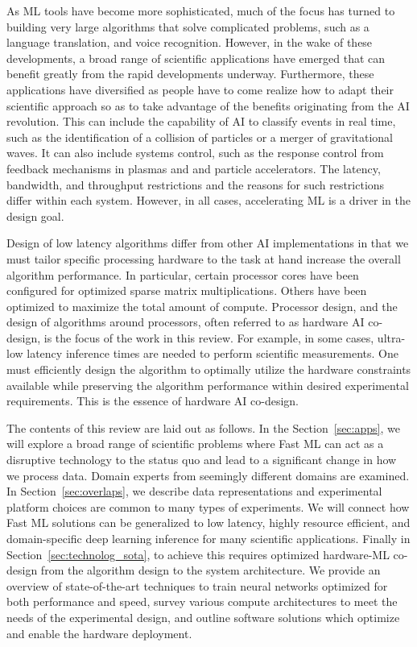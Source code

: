 As ML tools have become more sophisticated, much of the focus has turned to building very large  algorithms that solve complicated problems, such as a language translation, and voice recognition. 
However, in the wake of these developments, a broad range of scientific applications have emerged that can benefit  greatly from the rapid developments underway. 
Furthermore, these applications have diversified as people have to come realize how to adapt their scientific approach so as to take advantage of the benefits originating from the AI revolution. 
This can include the capability of AI to classify events in real time, such as the identification of a collision of particles or a merger of gravitational waves. 
It can also include systems control, such as the response control from feedback mechanisms in plasmas and and particle accelerators. 
The latency, bandwidth, and throughput restrictions and the reasons for such restrictions differ within each system. However, in all cases, accelerating ML is a driver in the design goal. 

Design of low latency algorithms differ from other AI implementations in that we must tailor specific processing hardware to the task at hand increase the overall algorithm performance. 
In particular, certain processor cores have been configured for optimized sparse matrix multiplications. 
Others have been optimized to maximize the total amount of compute. 
Processor design, and the design of algorithms around processors,  often referred to as hardware AI co-design, is the focus of the work in this review. 
For example, in some cases, ultra-low latency inference times are needed to perform scientific measurements. 
One must efficiently design the algorithm to optimally utilize the hardware constraints available while preserving the algorithm performance within desired experimental requirements. This is the essence of hardware AI co-design.

The contents of this review are laid out as follows.  
In the Section~\ref{sec:apps}, we will explore a broad range of scientific problems where Fast ML can act as a disruptive technology to the status quo and lead to a significant change in how we process data.  
Domain experts from seemingly different domains are examined.  
In Section~\ref{sec:overlaps}, we describe  data representations and experimental platform choices are common to many types of experiments.  
We will connect how Fast ML solutions can be generalized to low latency, highly resource efficient, and domain-specific deep learning inference for many scientific applications. 
Finally in Section~\ref{sec:technolog_sota}, to achieve this requires optimized hardware-ML co-design from the algorithm design to the system architecture.  
We provide an overview of state-of-the-art techniques to train neural networks optimized for both performance and speed, survey various compute architectures to meet the needs of the experimental design, and outline software solutions which optimize and enable the hardware deployment.    

